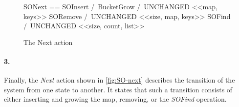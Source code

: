 \documentclass{uit-thesis}
\begin{document}
\begin{figure}
    \begin{tla}
        SONext ==   \/ SOInsert /\ BucketGrow /\ UNCHANGED <<map, keys>>
            \/ SORemove /\ UNCHANGED <<size, map, keys>>
            \/ SOFind   /\ UNCHANGED <<size, count, list>>
    \end{tla}
\begin{tlatex}
\end{tlatex}
    \caption{The Next action}
    \label{fig:SO-next}
\end{figure}
\paragraph{3.}Finally, the \textit{Next} action shown in \autoref{fig:SO-next} describes the transition of the system from one state to another. It states that such a transition consists of either inserting and growing the map, removing, or the \textit{SOFind} operation.
\end{document}
